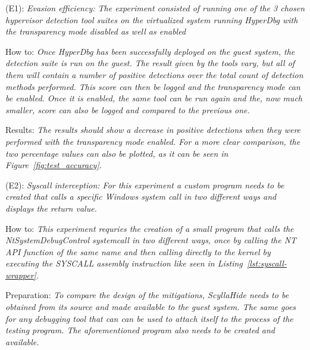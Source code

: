\begin{compactdesc}

    \item[(E1):] \textit{Evasion efficiency:
    The experiment consisted of running one of the 3 chosen hypervisor detection tool suites on the virtualized system running HyperDbg with the transparency mode disabled as well as enabled}

    \begin{asparadesc}
        \item[How to:]  \textit{Once HyperDbg has been successfully deployed on the guest system, the detection suite is run on the guest. The result given by the tools vary, but all of them will contain 
        a number of positive detections over the total count of detection methods performed. This score can then be logged and the transparency mode can be enabled. Once it is enabled, the same tool can be run again 
        and the, now much smaller, score can also be logged and compared to the previous one.}

        \item[Results:] \textit{The results should show a decrease in positive detections when they were performed with the transparency mode enabled. For a more clear comparison, the two percentage values can also
        be plotted, as it can be seen in Figure~\ref{fig:test_accuracy}.}
    \end{asparadesc}

    \item[(E2):] \textit{Syscall interception:
    For this experiment a custom program needs to be created that calls a specific Windows system call in two different ways and displays the return value.}

    \begin{asparadesc}
        \item[How to:]  \textit{This experiment requries the creation of a small program that calls the NtSystemDebugControl systemcall in two different ways, once by calling the NT API function of the same name
        and then calling directly to the kernel by executing the SYSCALL assembly instruction like seen in Listing~\ref{lst:syscall-wrapper}.}
        
        \item[Preparation:]  \textit{To compare the design of the mitigations, ScyllaHide needs to be obtained from its source and made available to the guest system. The same goes for any debugging tool that can
        can be used to attach itself to the process of the testing program. The aforementioned program also needs to be created and available.} 
        

\end{asparadesc}
\end{compactdesc}

